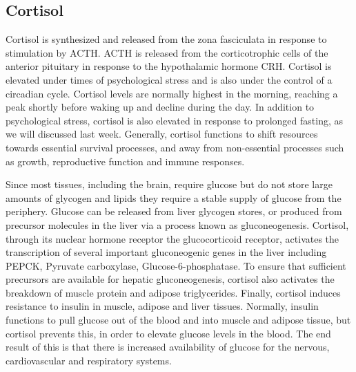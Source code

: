 \documentclass{tufte-handout}
\begin{document}
\subsection{Cortisol}

Cortisol is synthesized and released from the zona fasciculata in response to stimulation by ACTH.  ACTH is released from the corticotrophic cells of the anterior pituitary in response to the hypothalamic hormone CRH.  Cortisol is elevated under times of psychological stress and is also under the control of a circadian cycle.  Cortisol levels are normally highest in the morning, reaching a peak shortly before waking up and decline during the day.  In addition to psychological stress, cortisol is also elevated in response to prolonged fasting, as we will discussed last week.  Generally, cortisol functions to shift resources towards essential survival processes, and away from non-essential processes such as growth, reproductive function and immune responses.

  Since most tissues, including the brain, require glucose but do not store large amounts of glycogen and lipids they require a stable supply of glucose from the periphery.  Glucose can be released from liver glycogen stores, or produced from precursor molecules in the liver via a process known as gluconeogenesis.  Cortisol, through its nuclear hormone receptor the glucocorticoid receptor, activates the transcription of several important gluconeogenic genes in the liver including PEPCK, Pyruvate carboxylase, Glucose-6-phosphatase.  To ensure that sufficient precursors are available for hepatic gluconeogenesis, cortisol also activates the breakdown of muscle protein and adipose triglycerides.  Finally, cortisol induces resistance to insulin in muscle, adipose and liver tissues.  Normally, insulin functions to pull glucose out of the blood and into muscle and adipose tissue, but cortisol prevents this, in order to elevate glucose levels in the blood.  The end result of this is that there is increased availability of glucose for the nervous, cardiovascular and respiratory systems.
\end{document}
